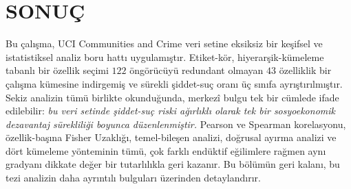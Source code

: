 \documentclass{ieeeaccess}
\begin{document}
\section{SONUÇ}
\label{sec:conclusion}
Bu çalışma, UCI Communities and Crime veri setine eksiksiz bir keşifsel ve istatistiksel analiz boru hattı uygulamıştır. Etiket-kör, hiyerarşik-kümeleme tabanlı bir özellik seçimi $122$ öngörücüyü redundant olmayan $43$ özelliklik bir çalışma kümesine indirgemiş ve sürekli şiddet-suç oranı üç sınıfa ayrıştırılmıştır. Sekiz analizin tümü birlikte okunduğunda, merkezî bulgu tek bir cümlede ifade edilebilir: \emph{bu veri setinde şiddet-suç riski ağırlıklı olarak tek bir sosyoekonomik dezavantaj sürekliliği boyunca düzenlenmiştir.} Pearson ve Spearman korelasyonu, özellik-başına Fisher Uzaklığı, temel-bileşen analizi, doğrusal ayırma analizi ve dört kümeleme yönteminin tümü, çok farklı endüktif eğilimlere rağmen aynı gradyanı dikkate değer bir tutarlılıkla geri kazanır. Bu bölümün geri kalanı, bu tezi analizin daha ayrıntılı bulguları üzerinden detaylandırır.
\end{document}

